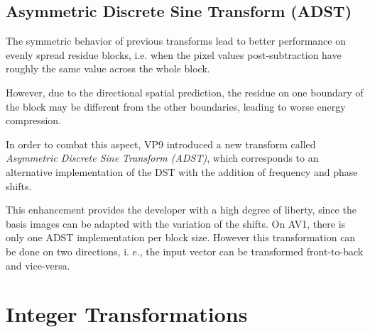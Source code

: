 \subsection{Asymmetric Discrete Sine Transform (ADST)}

\nocite{hanButterflyStructuredDesign2013}
\nocite{bingNextgenerationVideoCoding2015}

The symmetric behavior of previous transforms lead to better performance on evenly spread residue blocks, i.e. when the pixel values post-subtraction have roughly the same value across the whole block.

However, due to the directional spatial prediction, the residue on one boundary of the block may be different from the other boundaries, leading to worse energy compression.

In order to combat this aspect, VP9 introduced a new transform called \emph{Asymmetric Discrete Sine Transform (ADST)}, which corresponds to an alternative implementation of the DST with the addition of frequency and phase shifts.

This enhancement provides the developer with a high degree of liberty, since the basis images can be adapted with the variation of the shifts. On AV1, there is only one ADST implementation per block size. However this transformation can be done on two directions, i. e., the input vector can be transformed front-to-back and vice-versa.


\section{Integer Transformations}


\clearpage
\printbibliography[heading=subbibliography]
